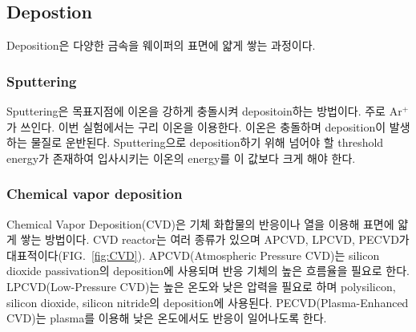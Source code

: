 \documentclass[aps,reprint,superscriptaddress,10pt]{revtex4-2}
\begin{document}
  \subsection{Depostion}
  Deposition은 다양한 금속을 웨이퍼의 표면에 얇게 쌓는 과정이다.
  \subsubsection{Sputtering}
  Sputtering은 목표지점에 이온을 강하게 충돌시켜 depositoin하는 방법이다. 주로 Ar$^+$가 쓰인다.
  이번 실험에서는 구리 이온을 이용한다.
  이온은 충돌하며 deposition이 발생하는 물질로 운반된다. Sputtering으로 deposition하기 위해
  넘어야 할 threshold energy가 존재하여 입사시키는 이온의 energy를 이 값보다 크게 해야 한다.
  \subsubsection{Chemical vapor deposition}
  Chemical Vapor Deposition(CVD)은 기체 화합물의 반응이나 열을 이용해 표면에 얇게 쌓는 방법이다.
  CVD reactor는 여러 종류가 있으며 APCVD, LPCVD, PECVD가 대표적이다(FIG.~\ref{fig:CVD}). 
  APCVD(Atmospheric Pressure CVD)는 
  silicon dioxide passivation의 deposition에 사용되며 반응 기체의 높은 흐름율을 필요로 한다.
  LPCVD(Low-Pressure CVD)는 
  높은 온도와 낮은 압력을 필요로 하며 polysilicon, silicon dioxide, 
  silicon nitride의 deposition에 사용된다. 
  PECVD(Plasma-Enhanced CVD)는 plasma를 이용해 낮은 온도에서도
  반응이 일어나도록 한다.
\end{document}

